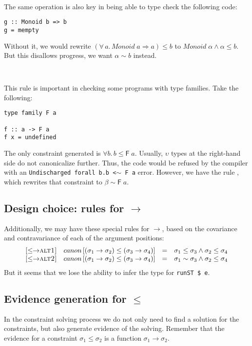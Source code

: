 \documentclass[12pt]{article}
\begin{document}
\

\noindent The same operation is also key in being able to type check the following code:
\begin{verbatim}
g :: Monoid b => b
g = mempty
\end{verbatim}
Without it, we would rewrite $(\forall\, a.\, \textit{Monoid} \; a \Rightarrow a) \leq b$ to $\textit{Monoid} \; \alpha \wedge \alpha \leq b$. But this disallows progress, we want $\alpha \sim b$ instead.

\

\noindent This rule is important in checking some programs with type families. Take the following:
\begin{verbatim}
type family F a

f :: a -> F a
f x = undefined
\end{verbatim}
The only constraint generated is $\forall b. \, b \leq \mathsf{F} \; a$. Usually, $\upsilon$ types at the right-hand side do not canonicalize further. Thus, the code would be refused by the compiler with an {\tt Undischarged forall b.b <$\sim$ F a} error. However, we have the rule {}, which rewrites that constraint to $\beta \sim \mathsf{F} \; a$.

\subsection{Design choice: rules for $\to$}

\noindent Additionally, we may have these special rules for $\to$, based on the covariance and contravariance of each of the argument positions:
$$
\begin{array}{lrcl}
\textsc{[$\leq\to$alt1]} & canon\left[(\sigma_1 \to \sigma_2) \leq (\sigma_3 \to \sigma_4)\right] & = & \sigma_1 \leq \sigma_3 \wedge \sigma_2 \leq \sigma_4 \\
\textsc{[$\leq\to$alt2]} & canon\left[(\sigma_1 \to \sigma_2) \leq (\sigma_3 \to \sigma_4)\right] & = & \sigma_1 \sim \sigma_3 \wedge \sigma_2 \leq \sigma_4
\end{array}
$$
But it seems that we lose the ability to infer the type for {\tt runST \$ e}.

\subsection{Evidence generation for $\leq$}

In the constraint solving process we do not only need to find a solution for the constraints, but also generate evidence of the solving. Remember that the evidence for a constraint $\sigma_1 \leq \sigma_2$ is a function $\sigma_1 \to \sigma_2$.
\end{document}
